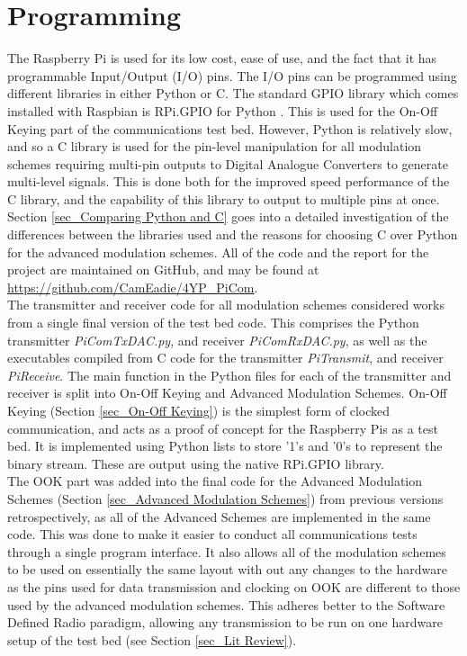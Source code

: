 \documentclass[../main.tex]{subfiles}
\begin{document}

\section{Programming}

The Raspberry Pi is used for its low cost, ease of use, and the fact that it has programmable Input/Output (I/O) pins.
The I/O pins can be programmed using different libraries in either Python or C.
The standard GPIO library which comes installed with Raspbian is RPi.GPIO for Python \cite{lib_RPi.GPIO}.
This is used for the On-Off Keying part of the communications test bed.
However, Python is relatively slow, and so a C library is used for the pin-level manipulation for all modulation schemes requiring multi-pin outputs to Digital Analogue Converters to generate multi-level signals.
This is done both for the improved speed performance of the C library, and the capability of this library to output to multiple pins at once.
Section \ref{sec_Comparing Python and C} goes into a detailed  investigation of the differences between the libraries used and the reasons for choosing C over Python for the advanced modulation schemes.
All of the code and the report for the project are maintained on GitHub, and may be found at \url{https://github.com/CamEadie/4YP_PiCom}.\\

The transmitter and receiver code for all modulation schemes considered works from a single final version of the test bed code.
This comprises the Python transmitter \textit{PiComTx\textunderscore DAC.py}, and receiver \textit{PiComRx\textunderscore DAC.py}, as well as the executables compiled from C code for the transmitter \textit{PiTransmit}, and receiver \textit{PiReceive}.
The main function in the Python files for each of the transmitter and receiver is split into On-Off Keying and Advanced Modulation Schemes.
On-Off Keying (Section \ref{sec_On-Off Keying}) is the simplest form of clocked communication, and acts as a proof of concept for the Raspberry Pis as a test bed.
It is implemented using Python lists to store '1's and '0's to represent the binary stream.
These are output using the native RPi.GPIO library.\\

The OOK part was added into the final code for the Advanced Modulation Schemes (Section \ref{sec_Advanced Modulation Schemes}) from previous versions retrospectively, as all of the Advanced Schemes are implemented in the same code.
This was done to make it easier to conduct all communications tests through a single program interface.
It also allows all of the modulation schemes to be used on essentially the same layout with out any changes to the hardware as the pins used for data transmission and clocking  on OOK are different to those used by the advanced modulation schemes.
This adheres better to the Software Defined Radio paradigm, allowing any transmission to be run on one hardware setup of the test bed (see Section \ref{sec_Lit Review}).\\
\end{document}
